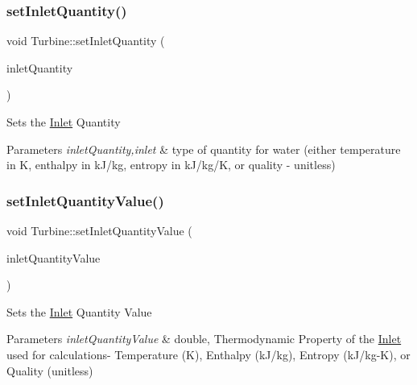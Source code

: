 \subsubsection{\texorpdfstring{set\+Inlet\+Quantity()}{setInletQuantity()}\hspace{0.1cm}{\footnotesize\ttfamily [3/3]}}
{\footnotesize\ttfamily void Turbine\+::set\+Inlet\+Quantity (\begin{DoxyParamCaption}\item[{\hyperlink{class_steam_properties_ae0294bedf7d178c2d8fb6aed0f62fbff}{Steam\+Properties\+::\+Thermodynamic\+Quantity}}]{inlet\+Quantity }\end{DoxyParamCaption})}

Sets the \hyperlink{class_inlet}{Inlet} Quantity


\begin{DoxyParams}{Parameters}
{\em inlet\+Quantity,inlet} & type of quantity for water (either temperature in K, enthalpy in k\+J/kg, entropy in k\+J/kg/K, or quality -\/ unitless) \\
\hline
\end{DoxyParams}
\mbox{\label{class_turbine_ac01a053462c83e21ecc2158e75477542}} 
\subsubsection{\texorpdfstring{set\+Inlet\+Quantity\+Value()}{setInletQuantityValue()}\hspace{0.1cm}{\footnotesize\ttfamily [1/3]}}
{\footnotesize\ttfamily void Turbine\+::set\+Inlet\+Quantity\+Value (\begin{DoxyParamCaption}\item[{double}]{inlet\+Quantity\+Value }\end{DoxyParamCaption})}

Sets the \hyperlink{class_inlet}{Inlet} Quantity Value


\begin{DoxyParams}{Parameters}
{\em inlet\+Quantity\+Value} & double, Thermodynamic Property of the \hyperlink{class_inlet}{Inlet} used for calculations-\/ Temperature (K), Enthalpy (k\+J/kg), Entropy (k\+J/kg-\/K), or Quality (unitless) \\
\hline
\end{DoxyParams}


